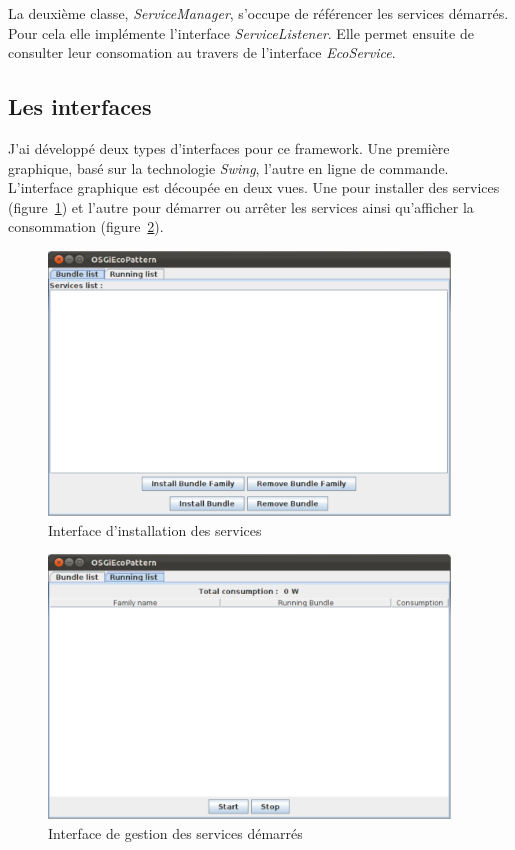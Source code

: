 \documentclass[a4paper, 11pt]{report}
\begin{document}
La deuxième classe, \textit{ServiceManager}, s'occupe de référencer les services démarrés. Pour cela elle implémente l'interface \textit{ServiceListener}. Elle permet ensuite de consulter leur consomation au travers de l'interface \textit{EcoService}.
		
		\subsection{Les interfaces}
J'ai développé deux types d'interfaces pour ce framework. Une première graphique, basé sur la technologie \textit{Swing}, l'autre en ligne de commande. L'interface graphique est découpée en deux vues. Une pour installer des services (figure~\ref{BdlList}) et l'autre pour démarrer ou arrêter les services ainsi qu'afficher la consommation (figure~\ref{RngList}).

\begin{figure}
	\centering
	\includegraphics[width=0.95\textwidth]{figures/EcoPattern_Bundle_List_View}
	\caption{Interface d'installation des services}
	\label{BdlList}
\end{figure}
\begin{figure}
	\centering
	\includegraphics[width=0.95\textwidth]{figures/EcoPattern_Running_List_View}
	\caption{Interface de gestion des services démarrés}
	\label{RngList}
\end{figure}
\end{document}
